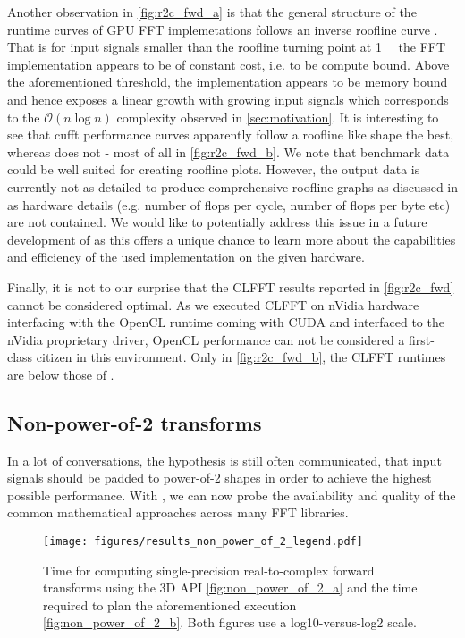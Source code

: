 Another observation in \cref{fig:r2c_fwd_a} is that the general structure of the runtime curves of GPU FFT implemetations follows an inverse roofline curve \cite{williams2009roofline}. That is for input signals smaller than the roofline turning point at \SI{1}{\mebi\byte} the FFT implementation appears to be of constant cost, i.e. to be compute bound. Above the aforementioned threshold, the implementation appears to be memory bound and hence exposes a linear growth with growing input signals which corresponds to the $\mathcal{O}(n \log n)$ complexity observed in \cref{sec:motivation}. It is interesting to see that cufft performance curves apparently follow a roofline like shape the best, whereas \fftw{} does not - most of all in \cref{fig:r2c_fwd_b}.  We note that \gearshifft{} benchmark data could be well suited for creating roofline plots. However, the output data is currently not as detailed to produce comprehensive roofline graphs as discussed in \cite{ofenbeck2014applying} as hardware details (e.g. number of flops per cycle, number of flops per byte etc) are not contained. We would like to potentially address this issue in a future development of \gearshifft{} as this offers a unique chance to learn more about the capabilities and efficiency of the used implementation on the given hardware. 
 
Finally, it is not to our surprise that the CLFFT results reported in \cref{fig:r2c_fwd} cannot be considered optimal. As we executed CLFFT on nVidia hardware interfacing with the OpenCL runtime coming with CUDA and interfaced to the nVidia proprietary driver, OpenCL performance can not be considered a first-class citizen in this environment. Only in \cref{fig:r2c_fwd_b}, the CLFFT runtimes are below those of \fftw{}.
 
\subsection{Non-power-of-2 transforms}
\label{ssec:nonpowerof2}

In a lot of conversations, the hypothesis is still often communicated, that input signals should be padded to power-of-2 shapes in order to achieve the highest possible performance. With \gearshifft{}, we can now probe the availability and quality of the common mathematical approaches across many FFT libraries. 

\begin{figure}[!tbp]
  \centering
  \texttt{[image: figures/results\_non\_power\_of\_2\_legend.pdf]}\vspace{-1em}
  \hfill
  \caption{Time for computing single-precision real-to-complex forward transforms using the 3D API \cref{fig:non_power_of_2_a} and the time required to plan the aforementioned execution \cref{fig:non_power_of_2_b}. Both figures use a log10-versus-log2 scale.}
  \label{fig:non_power_of_2}
\end{figure}

